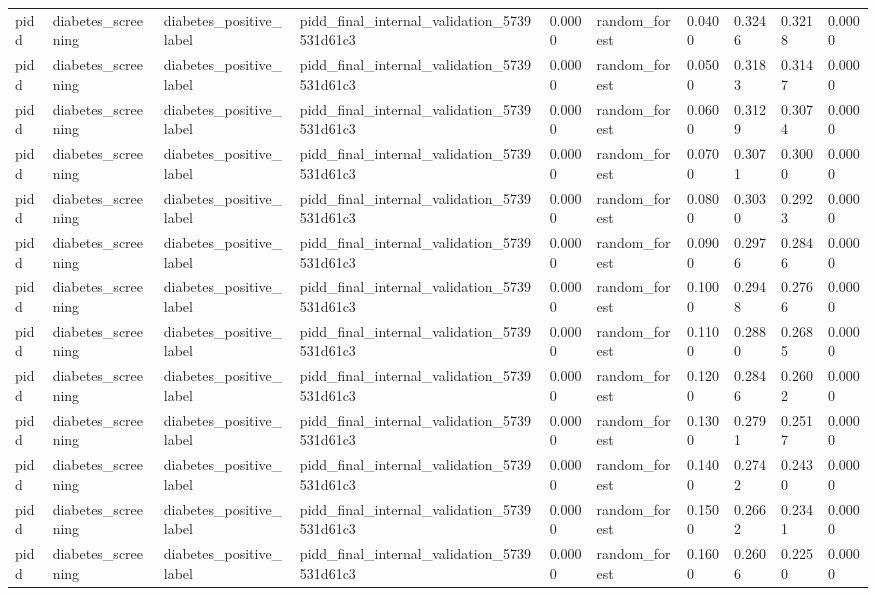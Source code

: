 \begin{tabular}{llllllllll}
pidd & diabetes\_screening & diabetes\_positive\_label & pidd\_final\_internal\_validation\_5739531d61c3 & 0.0000 & random\_forest & 0.0400 & 0.3246 & 0.3218 & 0.0000 \\
pidd & diabetes\_screening & diabetes\_positive\_label & pidd\_final\_internal\_validation\_5739531d61c3 & 0.0000 & random\_forest & 0.0500 & 0.3183 & 0.3147 & 0.0000 \\
pidd & diabetes\_screening & diabetes\_positive\_label & pidd\_final\_internal\_validation\_5739531d61c3 & 0.0000 & random\_forest & 0.0600 & 0.3129 & 0.3074 & 0.0000 \\
pidd & diabetes\_screening & diabetes\_positive\_label & pidd\_final\_internal\_validation\_5739531d61c3 & 0.0000 & random\_forest & 0.0700 & 0.3071 & 0.3000 & 0.0000 \\
pidd & diabetes\_screening & diabetes\_positive\_label & pidd\_final\_internal\_validation\_5739531d61c3 & 0.0000 & random\_forest & 0.0800 & 0.3030 & 0.2923 & 0.0000 \\
pidd & diabetes\_screening & diabetes\_positive\_label & pidd\_final\_internal\_validation\_5739531d61c3 & 0.0000 & random\_forest & 0.0900 & 0.2976 & 0.2846 & 0.0000 \\
pidd & diabetes\_screening & diabetes\_positive\_label & pidd\_final\_internal\_validation\_5739531d61c3 & 0.0000 & random\_forest & 0.1000 & 0.2948 & 0.2766 & 0.0000 \\
pidd & diabetes\_screening & diabetes\_positive\_label & pidd\_final\_internal\_validation\_5739531d61c3 & 0.0000 & random\_forest & 0.1100 & 0.2880 & 0.2685 & 0.0000 \\
pidd & diabetes\_screening & diabetes\_positive\_label & pidd\_final\_internal\_validation\_5739531d61c3 & 0.0000 & random\_forest & 0.1200 & 0.2846 & 0.2602 & 0.0000 \\
pidd & diabetes\_screening & diabetes\_positive\_label & pidd\_final\_internal\_validation\_5739531d61c3 & 0.0000 & random\_forest & 0.1300 & 0.2791 & 0.2517 & 0.0000 \\
pidd & diabetes\_screening & diabetes\_positive\_label & pidd\_final\_internal\_validation\_5739531d61c3 & 0.0000 & random\_forest & 0.1400 & 0.2742 & 0.2430 & 0.0000 \\
pidd & diabetes\_screening & diabetes\_positive\_label & pidd\_final\_internal\_validation\_5739531d61c3 & 0.0000 & random\_forest & 0.1500 & 0.2662 & 0.2341 & 0.0000 \\
pidd & diabetes\_screening & diabetes\_positive\_label & pidd\_final\_internal\_validation\_5739531d61c3 & 0.0000 & random\_forest & 0.1600 & 0.2606 & 0.2250 & 0.0000 \\

\end{tabular}
